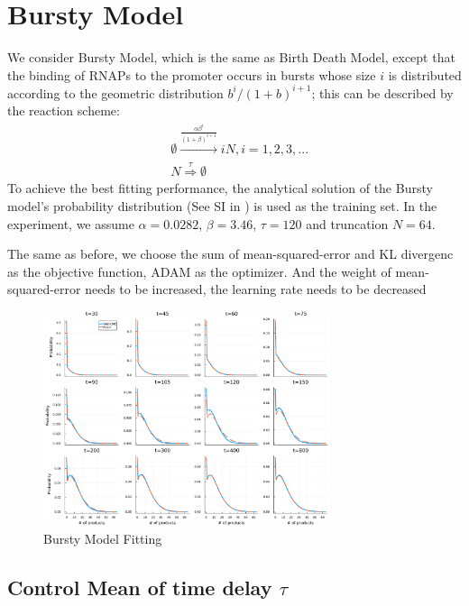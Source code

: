 \documentclass[a4paper,10pt]{article}
\begin{document}
\section{Bursty Model}

We consider Bursty Model, which is the same as Birth Death Model, except that the binding of RNAPs to the promoter occurs in bursts whose size $i$ is distributed according to the geometric distribution $b^i/(1 + b)^{i+1}$; this can be described by the reaction scheme:
\begin{equation}\label{birth-death}
	\begin{aligned}
		&\emptyset\stackrel{\frac{\alpha\beta^i}{(1+\beta)^{i+1}}}\longrightarrow iN,i=1,2,3,...\\ &N\stackrel{\tau}\Rightarrow\emptyset
	\end{aligned}
\end{equation}
To achieve the best fitting performance, the analytical solution of the Bursty model's probability distribution (See SI in \cite{jiang2021neural}) is used as the training set. In the experiment, we assume $\alpha=0.0282$, $\beta=3.46$, $\tau=120$ and truncation $N=64$.

The same as before, we choose the sum of mean-squared-error and KL divergenc as the  objective  function, ADAM as the optimizer. And the weight of mean-squared-error needs to be increased, the learning rate needs to be decreased
\begin{figure}[h]
	\centering
	\includegraphics[width=0.75\textwidth]{Figs/Bursty_fitting.pdf}
	\caption{Bursty Model Fitting}\label{Bursty Model Fitting}  
\end{figure}

\subsection{Control Mean of time delay $\tau$}
\end{document}
